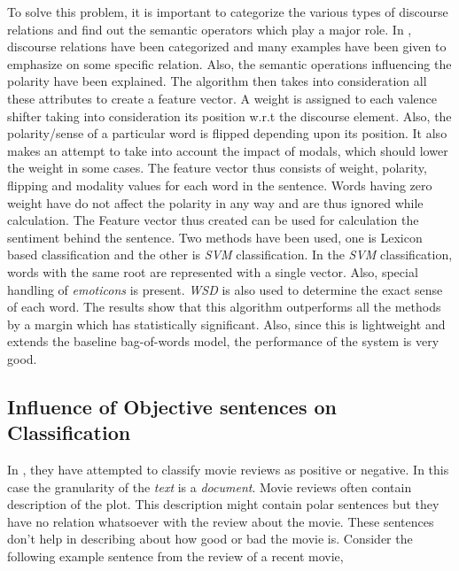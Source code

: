 \par
To solve this problem, it is important to categorize the various types of discourse relations and find out the semantic operators 
which play a major role. In \citep*{mukherjeesentiment}, discourse relations have been categorized and many examples have been given to emphasize on 
some specific relation. Also, the semantic operations influencing the polarity have been explained. The algorithm then takes
into consideration all these attributes to create a feature vector. A weight is assigned to each valence shifter taking into 
consideration its position w.r.t the discourse element. Also, the polarity/sense of a particular word is flipped depending upon 
its position. It also makes an attempt to take into account the impact of  modals, which should lower the weight in some cases. 
The feature vector thus consists of weight, polarity, flipping and modality values for each word in the sentence. Words having 
zero weight have do not affect the polarity in any way and are thus ignored while calculation. The Feature vector thus created can be used for calculation the sentiment behind the sentence.
Two methods have been used, one is Lexicon based classification and the other is \textit{SVM} classification. In the \textit{SVM} classification, 
words with the same root are represented with a single vector. Also, special handling of \textit{emoticons} is present. \textit{WSD} is also used
to determine the exact sense of each word. The results show that this algorithm outperforms all the methods by a margin which has
statistically significant. Also, since this is lightweight and extends the baseline bag-of-words model, the performance of the 
system is very good. 

\subsection{Influence of Objective sentences on Classification}\label{section:subanalysis}

In \citep*{pang2004sentimental}, they have attempted to classify movie reviews as positive or negative. In this case the granularity
of the \textit{text} is a \textit{document}. Movie reviews often contain description of the plot. This description might contain
polar sentences but they have no relation whatsoever with the review about the movie. These sentences don't help in describing
about how good or bad the movie is. Consider the following example sentence from the review of a recent movie,

